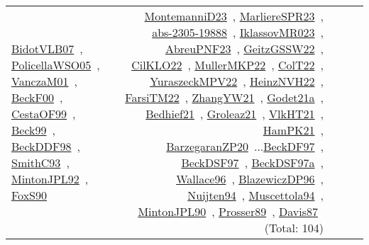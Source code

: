 {\begin{longtable}{p{3cm}r>{\raggedright\arraybackslash}p{6cm}>{\raggedright\arraybackslash}p{6cm}>{\raggedright\arraybackslash}p{8cm}}
\href{../works/BidotVLB07.pdf}{BidotVLB07}~\cite{BidotVLB07}, \href{../works/PolicellaWSO05.pdf}{PolicellaWSO05}~\cite{PolicellaWSO05}, \href{../works/VanczaM01.pdf}{VanczaM01}~\cite{VanczaM01}, \href{../works/BeckF00.pdf}{BeckF00}~\cite{BeckF00}, \href{../works/CestaOF99.pdf}{CestaOF99}~\cite{CestaOF99}, \href{../works/Beck99.pdf}{Beck99}~\cite{Beck99}, \href{../works/BeckDDF98.pdf}{BeckDDF98}~\cite{BeckDDF98}, \href{../works/SmithC93.pdf}{SmithC93}~\cite{SmithC93}, \href{../works/MintonJPL92.pdf}{MintonJPL92}~\cite{MintonJPL92}, \href{../works/FoxS90.pdf}{FoxS90}~\cite{FoxS90} & \href{../works/MontemanniD23.pdf}{MontemanniD23}~\cite{MontemanniD23}, \href{../works/MarliereSPR23.pdf}{MarliereSPR23}~\cite{MarliereSPR23}, \href{../works/abs-2305-19888.pdf}{abs-2305-19888}~\cite{abs-2305-19888}, \href{../works/IklassovMR023.pdf}{IklassovMR023}~\cite{IklassovMR023}, \href{../works/AbreuPNF23.pdf}{AbreuPNF23}~\cite{AbreuPNF23}, \href{../works/GeitzGSSW22.pdf}{GeitzGSSW22}~\cite{GeitzGSSW22}, \href{../works/CilKLO22.pdf}{CilKLO22}~\cite{CilKLO22}, \href{../works/MullerMKP22.pdf}{MullerMKP22}~\cite{MullerMKP22}, \href{../works/ColT22.pdf}{ColT22}~\cite{ColT22}, \href{../works/YuraszeckMPV22.pdf}{YuraszeckMPV22}~\cite{YuraszeckMPV22}, \href{../works/HeinzNVH22.pdf}{HeinzNVH22}~\cite{HeinzNVH22}, \href{../works/FarsiTM22.pdf}{FarsiTM22}~\cite{FarsiTM22}, \href{../works/ZhangYW21.pdf}{ZhangYW21}~\cite{ZhangYW21}, \href{../works/Godet21a.pdf}{Godet21a}~\cite{Godet21a}, \href{../works/Bedhief21.pdf}{Bedhief21}~\cite{Bedhief21}, \href{../works/Groleaz21.pdf}{Groleaz21}~\cite{Groleaz21}, \href{../works/VlkHT21.pdf}{VlkHT21}~\cite{VlkHT21}, \href{../works/HamPK21.pdf}{HamPK21}~\cite{HamPK21}, \href{../works/BarzegaranZP20.pdf}{BarzegaranZP20}~\cite{BarzegaranZP20}...\href{../works/BeckDF97.pdf}{BeckDF97}~\cite{BeckDF97}, \href{../works/BeckDSF97.pdf}{BeckDSF97}~\cite{BeckDSF97}, \href{../works/BeckDSF97a.pdf}{BeckDSF97a}~\cite{BeckDSF97a}, \href{../works/Wallace96.pdf}{Wallace96}~\cite{Wallace96}, \href{../works/BlazewiczDP96.pdf}{BlazewiczDP96}~\cite{BlazewiczDP96}, \href{../works/Nuijten94.pdf}{Nuijten94}~\cite{Nuijten94}, \href{../works/Muscettola94.pdf}{Muscettola94}~\cite{Muscettola94}, \href{../works/MintonJPL90.pdf}{MintonJPL90}~\cite{MintonJPL90}, \href{../works/Prosser89.pdf}{Prosser89}~\cite{Prosser89}, \href{../works/Davis87.pdf}{Davis87}~\cite{Davis87} (Total: 104)\\

\end{longtable}}
